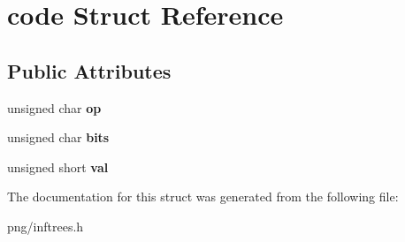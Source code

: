 \hypertarget{structcode}{}\section{code Struct Reference}
\label{structcode}
\subsection*{Public Attributes}
\begin{DoxyCompactItemize}
\item 
unsigned char {\bfseries op}\hypertarget{structcode_a4f075d73a9177d05cc7d332105295b83}{}\label{structcode_a4f075d73a9177d05cc7d332105295b83}

\item 
unsigned char {\bfseries bits}\hypertarget{structcode_a5defcebb356dca1a5a8d39995f28d66b}{}\label{structcode_a5defcebb356dca1a5a8d39995f28d66b}

\item 
unsigned short {\bfseries val}\hypertarget{structcode_a6f9c73627997e8fc6df02e620cf9a6f5}{}\label{structcode_a6f9c73627997e8fc6df02e620cf9a6f5}

\end{DoxyCompactItemize}


The documentation for this struct was generated from the following file\+:\begin{DoxyCompactItemize}
\item 
png/inftrees.\+h\end{DoxyCompactItemize}
